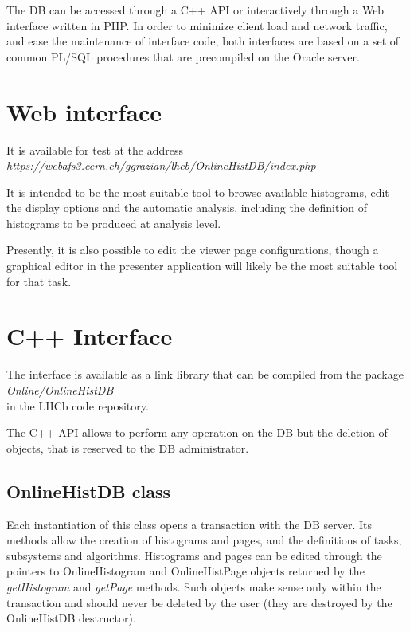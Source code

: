 \documentclass{lhcbnote}
\begin{document}
The DB can be accessed through a C++ API or interactively through a
Web interface written in PHP. In order to minimize client load and
network traffic, and ease the maintenance of interface code, both
interfaces  are based on a set of common PL/SQL procedures that are
precompiled on the Oracle server.

\section{Web interface}

It is available for test at the address\\
{\it https://webafs3.cern.ch/ggrazian/lhcb/OnlineHistDB/index.php}

It is intended to be the most suitable tool to browse available
histograms, edit the display options and the automatic analysis, including
the definition of histograms to be produced at analysis level.

Presently, it is also possible to edit the viewer page configurations, though
a graphical editor in the presenter application will likely be the
most suitable tool for that task.

\section{C++ Interface}

The interface is available as a link library that can be compiled from
the package \\
{\it Online/OnlineHistDB} \\
in the LHCb code repository.

The C++ API allows to perform any operation on the DB but the deletion
of objects, that is reserved to the DB administrator.

\subsection{OnlineHistDB class}
Each instantiation of this class opens a transaction with the DB
server. Its methods allow the creation of histograms and pages, and
the definitions of tasks, subsystems and algorithms. Histograms and
pages can be edited through the pointers to OnlineHistogram and
OnlineHistPage objects returned by the {\it getHistogram} and {\it
getPage} methods. Such objects make sense only within the transaction
and should never be deleted by the user (they are destroyed by the
OnlineHistDB destructor). 
\end{document}
